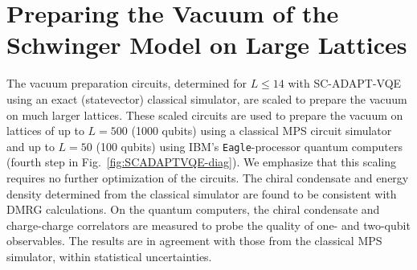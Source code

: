 \documentclass[aps, pra, onecolumn, tightenlines, letterpaper, amsmath, amssymb, preprintnumbers, floatfix, longbibliography, nofootinbib]{revtex4-2}
\begin{document}
\section{Preparing the Vacuum of the Schwinger Model on Large Lattices}
\label{sec:vacum_class_quan}
\noindent
The vacuum preparation circuits, determined for $L\leq14$ with SC-ADAPT-VQE using an exact (statevector) classical simulator, are scaled to prepare the vacuum on much larger lattices. 
These scaled circuits are used to prepare the vacuum on lattices of up to $L=500$ (1000 qubits) using a classical MPS circuit simulator
and up to $L=50$ (100 qubits) using IBM's {\tt Eagle}-processor quantum computers (fourth step in Fig.~\ref{fig:SCADAPTVQE-diag}).
We emphasize that this scaling requires no further optimization of the circuits.
The chiral condensate and energy density determined from the classical simulator
are found to be consistent with DMRG calculations.
On the quantum computers, the chiral condensate and charge-charge correlators 
are measured
to probe the quality of one- and two-qubit observables.
The results are in agreement with those from the classical MPS simulator, within statistical uncertainties.



\end{document}
